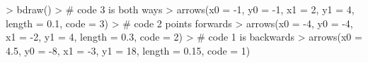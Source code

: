 \begin{Schunk}
\begin{Sinput}
> bdraw()
> # code 3 is both ways
> arrows(x0 = -1, y0 = -1, x1 = 2, y1 = 4, length = 0.1, code = 3)
> # code 2 points forwards
> arrows(x0 = -4, y0 = -4, x1 = -2, y1 = 4, length = 0.3, code = 2)
> # code 1 is backwards
> arrows(x0 = 4.5, y0 = -8, x1 = -3, y1 = 18, length = 0.15, code = 1)
\end{Sinput}
\end{Schunk}
